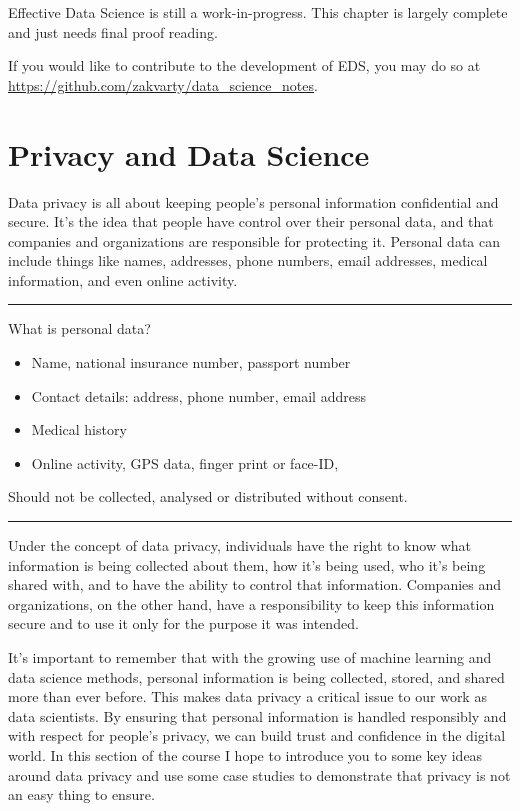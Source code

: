 \documentclass[
  12pt,
]{book}
\providecommand{\tightlist}{%
  \setlength{\itemsep}{0pt}\setlength{\parskip}{0pt}}
\begin{document}
Effective Data Science is still a work-in-progress. This chapter is largely complete and just needs final proof reading.

If you would like to contribute to the development of EDS, you may do so at \url{https://github.com/zakvarty/data_science_notes}.

\hypertarget{privacy-and-data-science}{%
\section{Privacy and Data Science}\label{privacy-and-data-science}}

Data privacy is all about keeping people's personal information confidential and secure. It's the idea that people have control over their personal data, and that companies and organizations are responsible for protecting it. Personal data can include things like names, addresses, phone numbers, email addresses, medical information, and even online activity.

\begin{center}\rule{0.5\linewidth}{0.5pt}\end{center}

What is personal data?

\begin{itemize}
\tightlist
\item
  Name, national insurance number, passport number
\item
  Contact details: address, phone number, email address
\item
  Medical history
\item
  Online activity, GPS data, finger print or face-ID,
\end{itemize}

Should not be collected, analysed or distributed without consent.

\begin{center}\rule{0.5\linewidth}{0.5pt}\end{center}

Under the concept of data privacy, individuals have the right to know what information is being collected about them, how it's being used, who it's being shared with, and to have the ability to control that information. Companies and organizations, on the other hand, have a responsibility to keep this information secure and to use it only for the purpose it was intended.

It's important to remember that with the growing use of machine learning and data science methods, personal information is being collected, stored, and shared more than ever before. This makes data privacy a critical issue to our work as data scientists. By ensuring that personal information is handled responsibly and with respect for people's privacy, we can build trust and confidence in the digital world.
In this section of the course I hope to introduce you to some key ideas around data privacy and use some case studies to demonstrate that privacy is not an easy thing to ensure.
\end{document}
